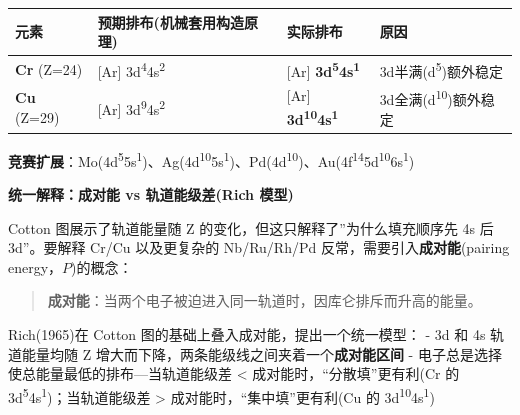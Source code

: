 \documentclass[a4paper,11pt]{ctexart}
\newcounter{none}
\newcommand{\箭}{\ensuremath{\rightarrow}}
\newcommand{\左箭}{\ensuremath{\leftarrow}}
\newcommand{\上箭}{\ensuremath{\uparrow}}
\newcommand{\下箭}{\ensuremath{\downarrow}}
\newcommand{\衡}{\ensuremath{\rightleftharpoons}}
\newcommand{\双箭}{\ensuremath{\leftrightarrow}}
\newcommand{\约等于}{\ensuremath{\approx}}
\newcommand{\小于等于}{\ensuremath{\leq}}
\newcommand{\大于等于}{\ensuremath{\geq}}
\newcommand{\不等于}{\ensuremath{\neq}}
\newcommand{\西格马}{\ensuremath{\sigma}}
\newcommand{\派}{\ensuremath{\pi}}
\begin{document}
{\def\LTcaptype{none} %
\begin{longtable}[]{@{}
  >{\raggedright\arraybackslash}p{}
  >{\raggedright\arraybackslash}p{}
  >{\raggedright\arraybackslash}p{}
  >{\raggedright\arraybackslash}p{}@{}}
\toprule\noalign{}
\begin{minipage}[b]{\linewidth}\raggedright
元素
\end{minipage} & \begin{minipage}[b]{\linewidth}\raggedright
预期排布(机械套用构造原理)
\end{minipage} & \begin{minipage}[b]{\linewidth}\raggedright
实际排布
\end{minipage} & \begin{minipage}[b]{\linewidth}\raggedright
原因
\end{minipage} \\
\midrule\noalign{}
\endhead
\bottomrule\noalign{}
\endlastfoot
\textbf{Cr} (Z=24) & {[}Ar{]} 3d\textsuperscript{4}4s\textsuperscript{2} & {[}Ar{]} \textbf{3d\textsuperscript{5}4s\textsuperscript{1}} & 3d半满(d\textsuperscript{5})额外稳定 \\
\textbf{Cu} (Z=29) & {[}Ar{]} 3d\textsuperscript{9}4s\textsuperscript{2} & {[}Ar{]} \textbf{3d\textsuperscript{10}4s\textsuperscript{1}} & 3d全满(d\textsuperscript{10})额外稳定 \\
\end{longtable}
}

\textbf{竞赛扩展}：Mo(4d\textsuperscript{5}5s\textsuperscript{1})、Ag(4d\textsuperscript{10}5s\textsuperscript{1})、Pd(4d\textsuperscript{10})、Au(4f\textsuperscript{14}5d\textsuperscript{10}6s\textsuperscript{1})

\textbf{统一解释：成对能 vs 轨道能级差(Rich 模型)}

Cotton 图展示了轨道能量随 Z 的变化，但这只解释了''为什么填充顺序先 4s 后 3d''。要解释 Cr/Cu 以及更复杂的 Nb/Ru/Rh/Pd 反常，需要引入\textbf{成对能}(pairing energy，\(P\))的概念：

\begin{quote}
\textbf{成对能}：当两个电子被迫进入同一轨道时，因库仑排斥而升高的能量。
\end{quote}

Rich(1965)在 Cotton 图的基础上叠入成对能，提出一个统一模型：
- 3d 和 4s 轨道能量均随 Z 增大而下降，两条能级线之间夹着一个\textbf{成对能区间}
- 电子总是选择使总能量最低的排布---当轨道能级差 \textless{} 成对能时，``分散填''更有利(Cr 的 3d\textsuperscript{5}4s\textsuperscript{1})；当轨道能级差 \textgreater{} 成对能时，``集中填''更有利(Cu 的 3d\textsuperscript{10}4s\textsuperscript{1})
\end{document}
